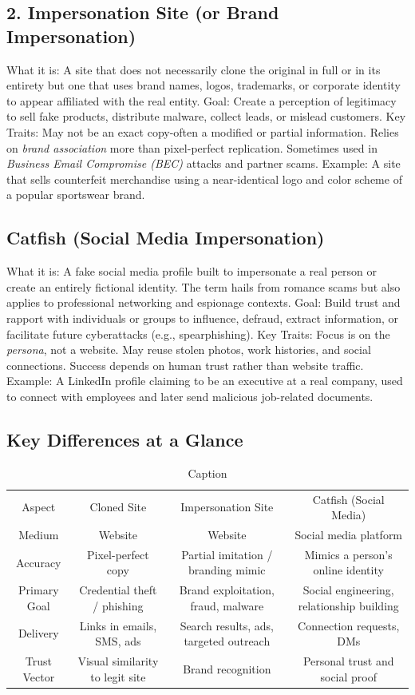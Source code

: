 \subsection{2. Impersonation Site (or Brand Impersonation)}
What it is:
A site that does not necessarily clone the original in full or in its entirety but one that uses brand names, logos, trademarks, or corporate identity to appear affiliated with the real entity.
Goal:
Create a perception of legitimacy to sell fake products, distribute malware, collect leads, or mislead customers.
Key Traits:
May not be an exact copy-often a modified or partial information.
Relies on \textit{brand association} more than pixel-perfect replication.
Sometimes used in \textit{Business Email Compromise (BEC)} attacks and partner scams.
Example:
A site that sells counterfeit merchandise using a near-identical logo and color scheme of a popular sportswear brand.

\subsection{Catfish (Social Media Impersonation)}
What it is:
A fake social media profile built to impersonate a real person or create an entirely fictional identity. The term hails from romance scams but also applies to professional networking and espionage contexts.
Goal:
Build trust and rapport with individuals or groups to influence, defraud, extract information, or facilitate future cyberattacks (e.g., spearphishing).
Key Traits:
Focus is on the \textit{persona}, not a website.
May reuse stolen photos, work histories, and social connections.
Success depends on human trust rather than website traffic.
Example:
A LinkedIn profile claiming to be an executive at a real company, used to connect with employees and later send malicious job-related documents.

\subsection{Key Differences at a Glance}

\begin{table}
    \centering
    \begin{tabular}{cccc}
         Aspect&  Cloned Site&  Impersonation Site& Catfish (Social Media)\\
         Medium&  Website&  Website& Social media platform\\
         Accuracy&  Pixel-perfect copy&  Partial imitation / branding mimic& Mimics a person's online identity\\
         Primary Goal&  Credential theft / phishing&  Brand exploitation, fraud, malware& Social engineering, relationship building\\
         Delivery&  Links in emails, SMS, ads&  Search results, ads, targeted outreach& Connection requests, DMs\\
         Trust Vector&  Visual similarity to legit site&  Brand recognition& Personal trust and social proof\\
    \end{tabular}
    \caption{Caption}
    \label{tab:placeholder1}
\end{table}

